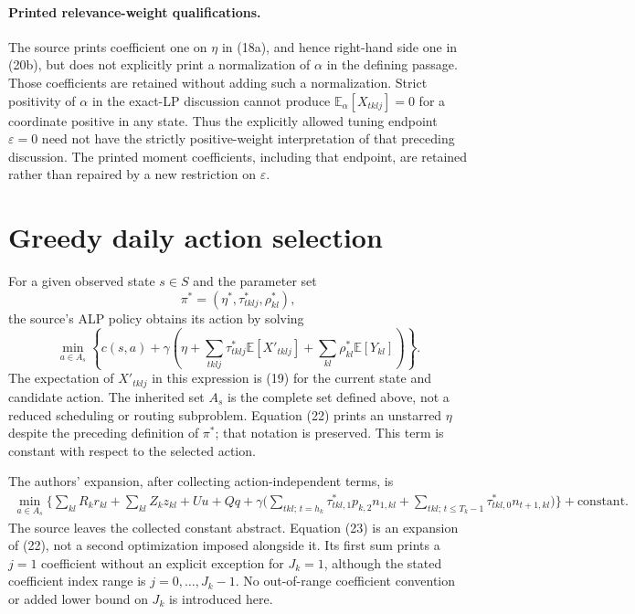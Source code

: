 \documentclass{article}
\begin{document}
\paragraph{Printed relevance-weight qualifications.}
The source prints coefficient one on $\eta$ in (18a), and hence right-hand side one in (20b), but does not explicitly print a normalization of $\alpha$ in the defining passage. Those coefficients are retained without adding such a normalization. Strict positivity of $\alpha$ in the exact-LP discussion cannot produce $\mathbb E_\alpha[X_{tklj}]=0$ for a coordinate positive in any state. Thus the explicitly allowed tuning endpoint $\varepsilon=0$ need not have the strictly positive-weight interpretation of that preceding discussion. The printed moment coefficients, including that endpoint, are retained rather than repaired by a new restriction on $\varepsilon$.

\section*{Greedy daily action selection}
For a given observed state $s\in S$ and the parameter set
\[
\pi^*=(\eta^*,\tau^*_{tklj},\rho^*_{kl}),
\]
the source's ALP policy obtains its action by solving
\begin{equation}
\min_{a\in A_s}
\left\{c(s,a)+\gamma\left(
\eta+\sum_{tklj}\tau^*_{tklj}\mathbb E[X'_{tklj}]
+\sum_{kl}\rho^*_{kl}\mathbb E[Y_{kl}]
\right)\right\}.
\tag{22}
\end{equation}
The expectation of $X'_{tklj}$ in this expression is (19) for the current state and candidate action. The inherited set $A_s$ is the complete set defined above, not a reduced scheduling or routing subproblem. Equation (22) prints an unstarred $\eta$ despite the preceding definition of $\pi^*$; that notation is preserved. This term is constant with respect to the selected action.

The authors' expansion, after collecting action-independent terms, is
\begin{equation}
\begin{split}
\min_{a\in A_s}\Biggl\{
\sum_{kl}R_kr_{kl}+\sum_{kl}Z_kz_{kl}+Uu+Qq
+\gamma\Biggl(
\sum_{tkl;\,t=h_k}\tau^*_{tkl,1}p_{k,2}n_{1,kl}
+\sum_{tkl;\,t\leq T_k-1}\tau^*_{tkl,0}n_{t+1,kl}
\Biggr)\Biggr\}
+\text{constant}.
\end{split}
\tag{23}
\end{equation}
The source leaves the collected constant abstract. Equation (23) is an expansion of (22), not a second optimization imposed alongside it. Its first sum prints a $j=1$ coefficient without an explicit exception for $J_k=1$, although the stated coefficient index range is $j=0,\ldots,J_k-1$. No out-of-range coefficient convention or added lower bound on $J_k$ is introduced here.
\end{document}
